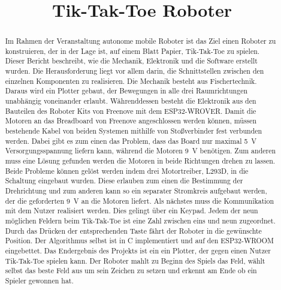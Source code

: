 \documentclass[conference,compsoc,final,a4paper]{IEEEtran}
\newcommand{\autorA}[0]{Büchner, Jannis}
\newcommand{\autorB}[0]{Büchner, Niklas}
\newcommand{\autorC}[0]{Vierling, Jörg}
\newcommand{\dokumententitel}[0]{Tik-Tak-Toe Roboter}
\begin{document}
\title{\dokumententitel}

\author{
  \IEEEauthorblockN{
    \autorA\\
    \autorB\\
    \autorC
  }
}

\maketitle
\thispagestyle{plain}
\pagestyle{plain}


\begin{abstract}

Im Rahmen der Veranstaltung autonome mobile Roboter ist das Ziel einen Roboter zu konstruieren, der in der Lage ist, auf einem Blatt Papier, Tik-Tak-Toe zu spielen. Dieser Bericht beschreibt, wie die Mechanik, Elektronik und die Software erstellt wurden. 
Die Herausforderung liegt vor allem darin, die Schnittstellen zwischen den einzelnen Komponenten zu realisieren. Die Mechanik besteht aus Fischertechnik. Daraus wird ein Plotter gebaut, der Bewegungen in alle drei Raumrichtungen unabhängig voneinander erlaubt. Währenddessen besteht die Elektronik aus den Bauteilen des Roboter Kits von Freenove mit dem ESP32-WROVER. Damit die Motoren an das Breadboard von Freenove angeschlossen werden können, müssen bestehende Kabel von beiden Systemen mithilfe von Stoßverbinder fest verbunden werden. Dabei gibt es zum einen das Problem, dass das Board nur maximal \qty{5}{V} Versorgungsspannung liefern kann, während die Motoren \qty{9}{V} benötigen. Zum anderen muss eine Lösung gefunden werden die Motoren in beide Richtungen drehen zu lassen. Beide Probleme können gelöst werden indem drei Motortreiber, L293D,  in die Schaltung eingebaut wurden. Diese erlauben zum einen die Bestimmung der Drehrichtung und zum anderen kann so ein separater Stromkreis aufgebaut werden, der die geforderten \qty{9}{V} an die Motoren liefert. Als nächstes muss die Kommunikation mit dem Nutzer realisiert werden. Dies gelingt über ein Keypad. Jedem der neun möglichen Feldern beim Tik-Tak-Toe ist eine Zahl zwischen eins und neun zugeordnet. Durch das Drücken der entsprechenden Taste fährt der Roboter in die gewünschte Position. Der Algorithmus selbst ist in C implementiert und auf den ESP32-WROOM eingebettet. 
Das Endergebnis des Projekts ist ein ein Plotter, der gegen einen Nutzer Tik-Tak-Toe spielen kann. Der Roboter mahlt zu Beginn des Spiels das Feld, wählt selbst das beste Feld aus um sein Zeichen zu setzen und erkennt am Ende ob ein Spieler gewonnen hat.

\end{abstract}
\end{document}
